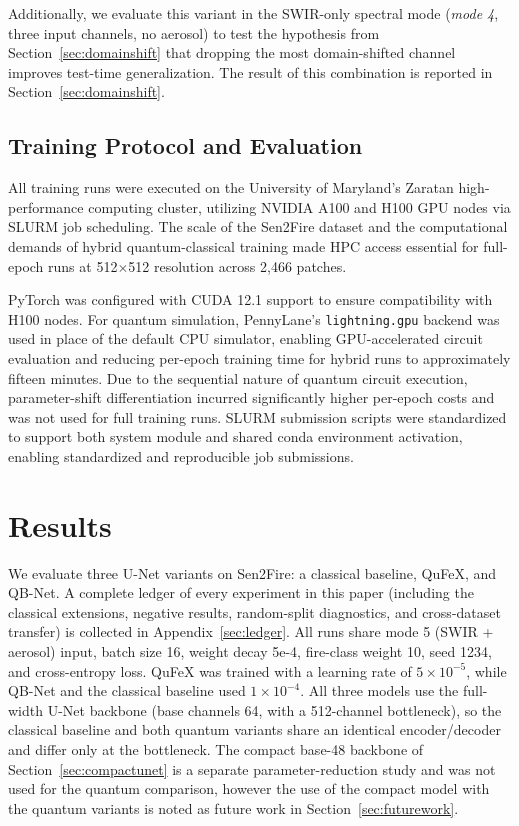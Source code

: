 \documentclass{article}
\begin{document}
Additionally, we evaluate this variant in the SWIR-only spectral mode (\emph{mode 4}, three input channels, no aerosol) to test the hypothesis from Section~\ref{sec:domainshift} that dropping the most domain-shifted channel improves test-time generalization. The result of this combination is reported in Section~\ref{sec:domainshift}.

\subsection{Training Protocol and Evaluation}

All training runs were executed on the University of Maryland's Zaratan high-performance computing cluster, utilizing NVIDIA A100 and H100 GPU nodes via SLURM job scheduling. The scale of the Sen2Fire dataset and the computational demands of hybrid quantum-classical training made HPC access essential for full-epoch runs at 512$\times$512 resolution across 2,466 patches.

PyTorch was configured with CUDA 12.1 support to ensure compatibility with H100 nodes. For quantum simulation, PennyLane's \texttt{lightning.gpu} backend was used in place of the default CPU simulator, enabling GPU-accelerated circuit evaluation and reducing per-epoch training time for hybrid runs to approximately fifteen minutes. Due to the sequential nature of quantum circuit execution, parameter-shift differentiation incurred significantly higher per-epoch costs and was not used for full training runs. SLURM submission scripts were standardized to support both system module and shared conda environment activation, enabling standardized and reproducible job submissions.

\section{Results}
\label{sec:results}

We evaluate three U-Net variants on Sen2Fire: a classical baseline, QuFeX, and QB-Net. A complete ledger of every experiment in this paper (including the classical extensions, negative results, random-split diagnostics, and cross-dataset transfer) is collected in Appendix~\ref{sec:ledger}. All runs share mode 5 (SWIR + aerosol) input, batch size 16, weight decay 5e-4, fire-class weight 10, seed 1234, and cross-entropy loss. QuFeX was trained with a learning rate of $5\times10^{-5}$, while QB-Net and the classical baseline used $1\times10^{-4}$. All three models use the full-width U-Net backbone (base channels 64, with a 512-channel bottleneck), so the classical baseline and both quantum variants share an identical encoder/decoder and differ only at the bottleneck. The compact base-48 backbone of Section~\ref{sec:compactunet} is a separate parameter-reduction study and was not used for the quantum comparison, however the use of the compact model with the quantum variants is noted as future work in Section~\ref{sec:futurework}.
\end{document}
